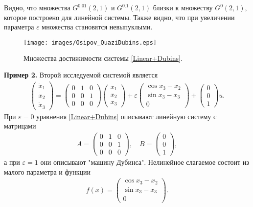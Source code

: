 \documentclass[../main.tex]{subfiles}
\begin{document}
 Видно, что множества $G^{0.01}(2,1) $ и $G^{0.1}(2,1) $ близки к множеству $G^{0}(2,1) $, которое построено для линейной системы. 
 Также видно, что при увеличении параметра $\varepsilon$ множества становятся невыпуклыми. 
 
\begin{figure}[ht]
 \centerline{
 \texttt{[image: images/Osipov\_QuaziDubins.eps]}}
 \caption{Множества достижимости системы \eqref{Linear+Dubins}.}
 \label{fig:LinearDubins}
\end{figure}
\textbf{Пример 2.}
 Второй исследуемой системой является
 \begin{gather}\label{Linear+Dubins}
 \begin{pmatrix} 
 \dot{x}_1 \\
 \dot{x}_2 \\ 
 \dot{x}_3 \end{pmatrix} = 
 \begin{pmatrix}
 0 & 1 & 0 \\
 0 & 0 & 1 \\
 0 & 0 & 0
 \end{pmatrix}
 \begin{pmatrix} 
 x_1 \\
 x_2 \\ 
 x_3 \end{pmatrix} + 
 \varepsilon
 \begin{pmatrix}
 \cos x_3 - x_2\\
 \sin x_3 - x_3 \\
 0
 \end{pmatrix} + 
 \begin{pmatrix}
 0 \\ 0 \\ 1
 \end{pmatrix} u.
 \end{gather}
 При $\varepsilon = 0$ уравнения \eqref{Linear+Dubins} описывают линейную систему с матрицами 
 \begin{gather*}
 A = \begin{pmatrix} 0 & 1 & 0\\
 0 & 0 & 1\\ 
 0 & 0 & 0 
 \end{pmatrix}, \quad B = \begin{pmatrix}
 0\\
 0\\
 1
 \end{pmatrix},
 \end{gather*}
 а при $\varepsilon = 1$ они описывают "машину Дубинса". 
 Нелинейное слагаемое состоит из малого параметра и функции
 \begin{gather*}
 f(x) = \begin{pmatrix}
 \cos x_3 - x_2\\
 \sin x_3 - x_3 \\
 0
 \end{pmatrix}.
 \end{gather*}
 
\end{document}
